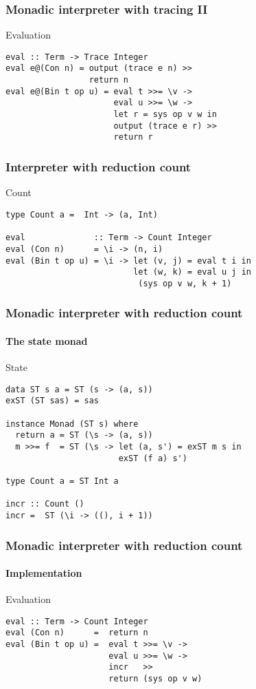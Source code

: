 \documentclass{beamer}
\begin{document}
\begin{frame}[fragile]
 \frametitle{Monadic interpreter with tracing II}
 \begin{exampleblock}{Evaluation}
\begin{verbatim}
eval :: Term -> Trace Integer
eval e@(Con n) = output (trace e n) >>
                 return n
eval e@(Bin t op u) = eval t >>= \v ->
                      eval u >>= \w ->
                      let r = sys op v w in
                      output (trace e r) >>
                      return r
\end{verbatim}
\end{exampleblock}      
\end{frame}             

\begin{frame}[fragile]
  \frametitle{Interpreter with reduction count}\small
  \begin{block}{Count}
\begin{verbatim}
type Count a =  Int -> (a, Int)

eval              :: Term -> Count Integer
eval (Con n)      = \i -> (n, i)
eval (Bin t op u) = \i -> let (v, j) = eval t i in    
                          let (w, k) = eval u j in
                           (sys op v w, k + 1)
\end{verbatim} 
\end{block}
\end{frame}            


\begin{frame}[fragile]
  \frametitle{Monadic interpreter with reduction count}
  \framesubtitle{The state monad}
  \begin{alertblock}{State}
\begin{verbatim}
data ST s a = ST (s -> (a, s))
exST (ST sas) = sas

instance Monad (ST s) where
  return a = ST (\s -> (a, s))
  m >>= f  = ST (\s -> let (a, s') = exST m s in
                       exST (f a) s')

type Count a = ST Int a

incr :: Count ()
incr =  ST (\i -> ((), i + 1))
\end{verbatim} 
\end{alertblock}
\end{frame}

\begin{frame}[fragile]
  \frametitle{Monadic interpreter with reduction count}
  \framesubtitle{Implementation}
\begin{exampleblock}{Evaluation}
\begin{verbatim}
eval :: Term -> Count Integer
eval (Con n)      =  return n
eval (Bin t op u) =  eval t >>= \v ->
                     eval u >>= \w ->
                     incr   >>
                     return (sys op v w)
\end{verbatim} 
\end{exampleblock}
\end{frame}            
\end{document}
